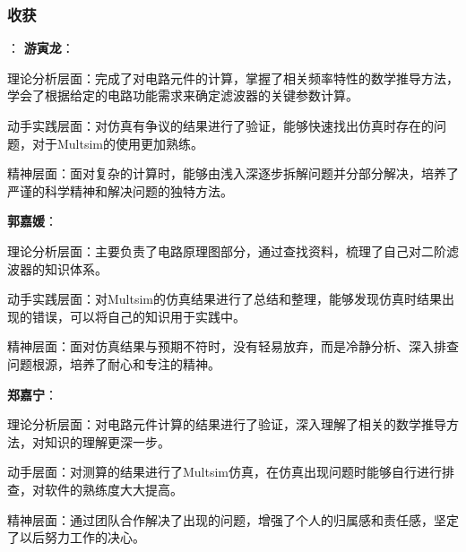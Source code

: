 \documentclass[./测控三级项目.tex]{subfiles} %
\begin{document}
		\subsubsection{收获}：
		\textbf{游寅龙}：\par
		理论分析层面：完成了对电路元件的计算，掌握了相关频率特性的数学推导方法，学会了根据给定的电路功能需求来确定滤波器的关键参数计算。\par
		动手实践层面：对仿真有争议的结果进行了验证，能够快速找出仿真时存在的问题，对于Multsim的使用更加熟练。\par
		精神层面：面对复杂的计算时，能够由浅入深逐步拆解问题并分部分解决，培养了严谨的科学精神和解决问题的独特方法。\par
		\textbf{郭嘉媛}：\par
		理论分析层面：主要负责了电路原理图部分，通过查找资料，梳理了自己对二阶滤波器的知识体系。\par
		动手实践层面：对Multsim的仿真结果进行了总结和整理，能够发现仿真时结果出现的错误，可以将自己的知识用于实践中。\par
		精神层面：面对仿真结果与预期不符时，没有轻易放弃，而是冷静分析、深入排查问题根源，培养了耐心和专注的精神。\par
		\textbf{郑嘉宁}：\par
		理论分析层面：对电路元件计算的结果进行了验证，深入理解了相关的数学推导方法，对知识的理解更深一步。\par
		动手层面：对测算的结果进行了Multsim仿真，在仿真出现问题时能够自行进行排查，对软件的熟练度大大提高。\par
		精神层面：通过团队合作解决了出现的问题，增强了个人的归属感和责任感，坚定了以后努力工作的决心。
		
	
	
\end{document}
